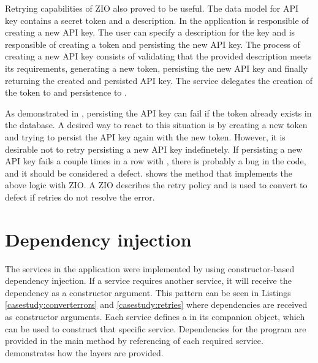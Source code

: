 

Retrying capabilities of ZIO also proved to be useful. The data model for API key contains a secret token and a description. In the application  is responsible of creating a new API key. The user can specify a description for the key and  is responsible of creating a token and persisting the new API key. The process of creating a new API key consists of validating that the provided description meets its requirements, generating a new token, persisting the new API key and finally returning the created and persisted API key. The service delegates the creation of the token to  and persistence to .



As demonstrated in , persisting the API key can fail if the token already exists in the database. A desired way to react to this situation is by creating a new token and trying to persist the API key again with the new token. However, it is desirable not to retry persisting a new API key indefinetely. If persisting a new API key fails a couple times in a row with , there is probably a bug in the code, and it should be considered a defect.  shows the  method that implements the above logic with ZIO. A ZIO  describes the retry policy and  is used to convert  to defect if retries do not resolve the error.


\section{Dependency injection}
The services in the application were implemented by using constructor-based dependency injection. If a service requires another service, it will receive the dependency as a constructor argument. This pattern can be seen in Listings \ref{casestudy:converterrors} and \ref{casestudy:retries} where dependencies are received as constructor arguments. Each service defines a  in its companion object, which can be used to construct that specific service. Dependencies for the program are provided in the main method by referencing  of each required service.  demonstrates how the layers are provided.

